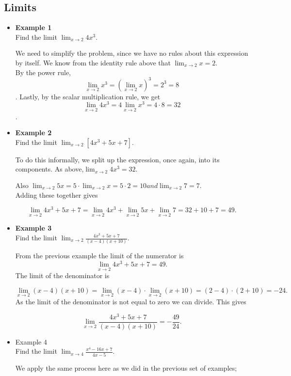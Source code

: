 \documentclass[]{article}
\begin{document}
\subsection*{Limits}	
\begin{itemize}
	\item \textbf{Example 1}\\
	Find the limit $\lim_{x\to 2} {4x^3}$.
	
	We need to simplify the problem, since we have no rules about this expression by itself. We know from the identity rule above that $\lim_{x\to 2} {x} = 2$.\\ \bigskip By the power rule, \[\lim_{x\to 2} {x^3} = \left(\lim_{x\to 2} x\right)^3 = 2^3 = 8\]. Lastly, by the scalar multiplication rule, we get \[\lim_{x\to 2} {4x^3} = 4\lim_{x\to 2} x^3=4 \cdot 8=32\].
	
	\item \textbf{Example 2} \\
	Find the limit $\lim_{x\to 2} [4x^3 + 5x +7].$
	
	To do this informally, we split up the expression, once again, into its components. As above,$\lim_{x\to 2} 4x^3=32$.
	
	Also $\lim_{x\to 2} 5x = 5\cdot\lim_{x\to 2} x = 5\cdot2=10 and \lim_{x\to 2} 7 =7$. \\ Adding these together gives
	
	\[\lim_{x\to 2} 4x^3 + 5x +7 = \lim_{x\to 2} 4x^3 + \lim_{x\to 2} 5x + \lim_{x\to 2} 7 = 32 + 10 +7 =49.\]
	
	\item \textbf{Example 3} \\
	Find the limit $\lim_{x\to 2}\frac{4x^3 + 5x +7}{(x-4)(x+10)}$.
	
	From the previous example the limit of the numerator is \[\lim_{x\to 2} 4x^3 + 5x +7 =49.\] The limit of the denominator is
	
	\[\lim_{x\to 2} (x-4)(x+10) = \lim_{x\to 2} (x-4) \cdot \lim_{x\to 2} (x+10) = (2-4)\cdot(2+10)=-24.\]
	As the limit of the denominator is not equal to zero we can divide. This gives
	
	\[\lim_{x\to 2}\frac{4x^3 + 5x +7}{(x-4)(x+10)} = -\frac{49}{24}.\]
	\item Example 4 \\
	Find the limit $\lim_{x\to 4}\frac{x^4 - 16x + 7}{4x-5}.$
	
	We apply the same process here as we did in the previous set of examples;
	

\end{itemize}
\end{document}
